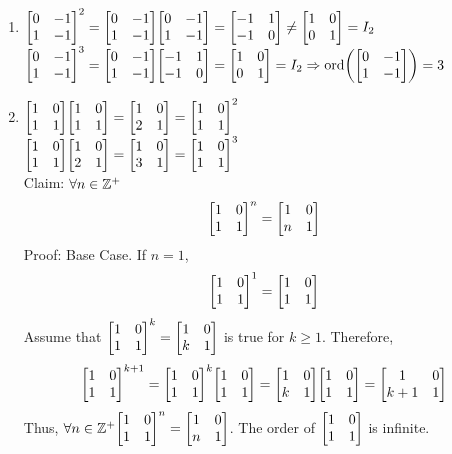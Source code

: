 \begin{solution} \phantom{blank}
    \begin{enumerate}
        \item $\mqty[0 & -1 \\ 1 & -1]^2 = \mqty[0 & -1 \\ 1 & -1] \mqty[0 & -1 \\ 1 & -1] = \mqty[-1 & 1 \\ -1 & 0] \neq \mqty[1 & 0 \\ 0 & 1] = I_2 $ \\
        $\mqty[0 & -1 \\ 1 & -1]^3 = \mqty[0 & -1 \\ 1 & -1] \mqty[-1 & 1 \\ -1 & 0] = \mqty[1 & 0 \\ 0 & 1] = I_2 \Rightarrow \text{ord}\qty(\mqty[0 & -1 \\ 1 & -1]) = 3$
        \item $\mqty[1 & 0 \\ 1 & 1] \mqty[1 & 0 \\ 1 & 1] = \mqty[1 & 0 \\ 2 & 1] = \mqty[1 & 0 \\ 1 & 1]^2$ \\
        $\mqty[1 & 0 \\ 1 & 1] \mqty[1 & 0 \\ 2 & 1] = \mqty[1 & 0 \\ 3 & 1] = \mqty[1 & 0 \\ 1 & 1]^3$ \\
        
        Claim: $\forall n \in \mathbb{Z}^+$
        \[ \mqty[1 & 0 \\ 1 & 1]^n = \mqty[1 & 0 \\ n & 1] \]
        Proof: Base Case. If $n = 1$,
        \[ \mqty[1 & 0 \\ 1 & 1]^1 = \mqty[1 & 0 \\ 1 & 1] \]
        Assume that $\mqty[1 & 0 \\ 1 & 1]^k = \mqty[1 & 0 \\ k & 1]$ is true for $k \geq 1$. Therefore,
        \[ \mqty[1 & 0 \\ 1 & 1]^{k+1} = \mqty[1 & 0 \\ 1 & 1 ]^k \mqty[1 & 0 \\ 1 & 1] = \mqty[1 & 0 \\ k & 1] \mqty[1 & 0 \\ 1 & 1] = \mqty[1 & 0 \\ k + 1 & 1]\]
        Thus, $\forall n \in \Z^+ \mqty[1 & 0 \\ 1 & 1]^n = \mqty[1 & 0 \\ n & 1]$. The order of $\mqty[1 & 0 \\ 1 & 1]$ is infinite.
    \end{enumerate}
\end{solution}

